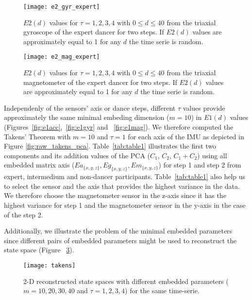 \documentclass{sigchi}
\begin{document}
      \begin{figure}[htbp!] 
  \centering    
  \texttt{[image: e2\_gyr\_expert]}
  \caption[PA]{$E2(d)$ values for $\tau=1,2,3,4$ with $0 \leq d \leq40 $
  from the triaxial gyroscope of the expert dancer for two steps.
  If $E2(d)$ values are approximately equal to 1 for any $d$ the time serie is random.
  }
  \label{fig:e2gyr}
  \end{figure}
      \begin{figure}[htbp!] 
  \centering    
  \texttt{[image: e2\_mag\_expert]}
  \caption[PA]{$E2(d)$ values for $\tau=1,2,3,4$ with $0 \leq d \leq40 $
  from the triaxial magnetometer of the expert dancer for two steps.
  If $E2(d)$ values are approximately equal to 1 for any $d$ the time serie is random.
  }
  \label{fig:e2mag}
  \end{figure}  

Independenly of the sensors' axis or dance steps, different $\tau$ values provide approximately the 
same minimal embeding dimension ($m=10$) in $E1(d)$ values (Figures~\ref{fig:e1acc},~\ref{fig:e1gyr} and ~\ref{fig:e1mag}).
We therefore computed the Takens' Theorem 
with $m=10$ and $\tau = 1$ for each axis of the IMU as depicted in Figure \ref{fig:raw_takens_pca}.
Table~\ref{tab:table1} illustrates the first two components and its addition values of the PCA ($C_1$, $C_2$, $C_1+ C_2$)
using all embedded matrix axis ($Ea_{ \{ x,y,z \} },Eg_{\{ x,y,z \}},Em_{\{ x,y,z \}}$) for step 1 and step 2 from expert, 
intermedium and non-dancer participants.
Table~\ref{tab:table1} also help us to select the sensor and the axis that 
provides the highest variance in the data.
We therefore choose the magnetometer sensor in the z-axis since it has the highest variance for step 1
and the magnetometer sensor in the y-axis in the case of the step 2.

Additionally, we illustrate the problem of the minimal embedded parameters since 
different pairs of embedded parameters might be used to reconstruct the state space (Figure ~\ref{fig:takens_problem}). 
\begin{figure}[htbp!] 
\centering    
\texttt{[image: takens]}
\caption[PA]{2-D reconstructed state spaces with different embedded parameters ($m=10,20,30,40$ and $\tau= 1,2,3,4$)
for the same time-serie.}
\label{fig:takens_problem}
\end{figure}
\end{document}
